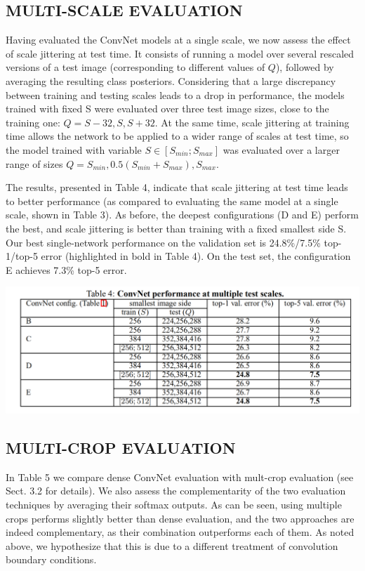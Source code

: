 \documentclass[12pt,a4paper,UTF8,twoside]{book}
\begin{document}
\hypertarget{multi-scale-evaluation}{%
\subsection{MULTI-SCALE EVALUATION}\label{multi-scale-evaluation}}

Having evaluated the ConvNet models at a single scale, we now assess the effect of scale jittering at test time. It consists of running a model over several rescaled versions of a test image (corresponding to different values of \(Q\)), followed by averaging the resulting class posteriors. Considering that a large discrepancy between training and testing scales leads to a drop in performance, the models trained with fixed S were evaluated over three test image sizes, close to the training one: \(Q = {S − 32, S, S + 32}\). At the same time, scale jittering at training time allows the network to be applied to a wider range of scales at test time, so the model trained with variable \(S \in [S_{min}; S_{max}]\) was evaluated over a larger range of sizes \(Q = {S_{min}, 0.5(S_{min} + S_{max}), S_{max}}\).

The results, presented in Table 4, indicate that scale jittering at test time leads to better performance (as compared to evaluating the same model at a single scale, shown in Table 3). As before, the deepest configurations (D and E) perform the best, and scale jittering is better than training with a fixed smallest side S. Our best single-network performance on the validation set is 24.8\%/7.5\% top-1/top-5 error (highlighted in bold in Table 4). On the test set, the configuration E achieves 7.3\% top-5 error.

\begin{center}\includegraphics[width=0.7\linewidth]{img/03-04} \end{center}

\hypertarget{multi-crop-evaluation}{%
\subsection{MULTI-CROP EVALUATION}\label{multi-crop-evaluation}}

In Table 5 we compare dense ConvNet evaluation with mult-crop evaluation (see Sect. 3.2 for details). We also assess the complementarity of the two evaluation techniques by averaging their softmax outputs. As can be seen, using multiple crops performs slightly better than dense evaluation, and the two approaches are indeed complementary, as their combination outperforms each of them. As noted above, we hypothesize that this is due to a different treatment of convolution boundary conditions.
\end{document}
